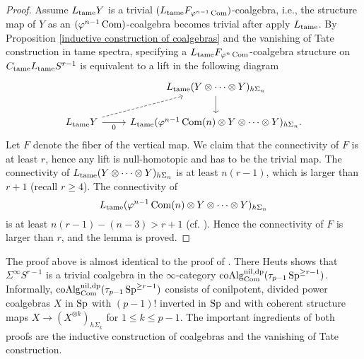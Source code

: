 \begin{proof}
	Assume $L_{\operatorname{\operatorname{tame}}} Y$ is a trivial $(L_{\operatorname{\operatorname{tame}}}F_{\varphi^{n-1} \operatorname{Com}})$-coalgebra, i.e., the structure map of $Y$ as an $(\varphi^{n-1} \operatorname{Com})$-coalgebra becomes trivial after apply $L_{\operatorname{\operatorname{tame}}}$.
	By Proposition \ref{inductive construction of coalgebras} and the vanishing of Tate construction in tame spectra, specifying a $L_{\operatorname{\operatorname{tame}}}F_{\varphi^{n} \operatorname{Com}}$-coalgebra structure on $C_{\operatorname{\operatorname{tame}}}L_{\operatorname{\operatorname{tame}}}S^{r-1}$ is equivalent to a lift in the following diagram
		\[
	\begin{tikzcd}
		& L_{\tame}(Y \otimes \cdots \otimes Y)_{h\Sigma_n}\\
		 L_{\tame}Y & L_{\tame}(\varphi^{n-1}\Com(n)\otimes Y \otimes \cdots \otimes Y)_{h\Sigma_n}
		\arrow[from = 2-1, to = 1-2, dashed]
		\arrow[from = 2-1, to = 2-2, "0" below]
		\arrow[from = 1-2, to = 2-2].
	\end{tikzcd}
	\]
	Let $F$ denote the fiber of the vertical map. We claim that the connectivity of $F$ is at least $r$, hence any lift is null-homotopic and has to be the trivial map.
	The connectivity of $L_{\operatorname{\operatorname{tame}}}(Y \otimes \cdots \otimes Y)_{h\Sigma_n}$ is at least $n(r-1)$, which is larger than $r+1$ (recall $r\geq 4$). 
    The connectivity of 
	$$
    L_{\operatorname{\operatorname{tame}}}(\varphi^{n-1}\operatorname{Com}(n)\otimes Y \otimes \cdots \otimes Y)_{h\Sigma_n}
	$$
	is at least $n(r-1)-(n-3) > r+1$ (cf. \cite[Example 4.7]{Heuts_Goodwillie}). Hence the connectivity of $F$ is larger than $r$, and the lemma is proved.
	
\end{proof}

\begin{remark}
	The proof above is almost identical to the proof of \cite[Lemma 6.17]{Heuts_Goodwillie}. 
	There Heuts shows that $\Sigma^{\infty}S^{r-1}$ is a trivial coalgebra in the $\infty$-category $\operatorname{coAlg}^{\operatorname{nil}, \operatorname{dp}}_{\operatorname{Com}}(\tau_{p-1}\operatorname{Sp}^{\geq r-1})$.
	Informally, $\operatorname{coAlg}^{\operatorname{nil}, \operatorname{dp}}_{\operatorname{Com}}(\tau_{p-1}\operatorname{Sp}^{\geq r-1})$ consists of conilpotent, divided power coalgebras $X$ in $\operatorname{Sp}$ with $(p-1)!$ inverted in $\operatorname{Sp}$ and with coherent structure maps $X\to (X^{\otimes k})_{h\Sigma_k}$ for $1\leq k \leq p-1$. 
	The important ingredients of both proofs are the inductive construction of coalgebras and the vanishing of Tate construction.
\end{remark}

